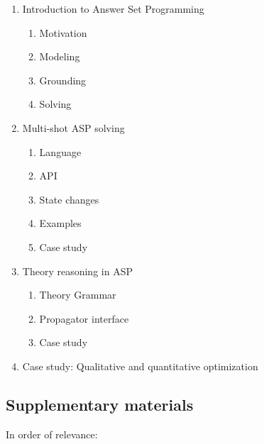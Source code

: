 \documentclass{article}
\begin{document}
\begin{enumerate}
\item Introduction to Answer Set Programming
  \begin{enumerate}
  \item Motivation
  \item Modeling
  \item Grounding
  \item Solving
  \end{enumerate}
\item Multi-shot ASP solving
  \begin{enumerate}
  \item Language
  \item API
  \item State changes
  \item Examples
  \item Case study
  \end{enumerate}
\item Theory reasoning in ASP
  \begin{enumerate}
  \item Theory Grammar
  \item Propagator interface
  \item Case study
  \end{enumerate}
\item Case study: Qualitative and quantitative optimization
\end{enumerate}

\subsection*{Supplementary materials}

In order of relevance:
\end{document}
